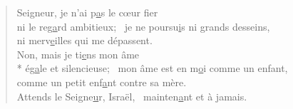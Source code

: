 
\begin{verse}
Seigneur, je n’ai p\underline{a}s le cœur fier \\
ni le reg\underline{a}rd ambitieux;~\psalmstar
je ne poursu\underline{i}s ni grands desseins, \\
ni merv\underline{e}illes qui me dépassent. \\

Non, mais je ti\underline{e}ns mon âme \\*
ég\underline{a}le et silencieuse;~\psalmstar
mon âme est en m\underline{o}i comme un enfant, \\
comme un petit enf\underline{a}nt contre sa mère. \\

Attends le Seigne\underline{u}r, Israël,~\psalmstar
mainten\underline{a}nt et à jamais. \\
\end{verse}

